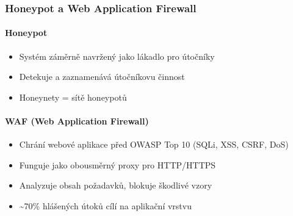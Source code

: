 \subsubsection{Honeypot a Web Application Firewall}

\paragraph{Honeypot}
\begin{itemize}
  \item Systém záměrně navržený jako lákadlo pro útočníky
  \item Detekuje a zaznamenává útočníkovu činnost
  \item Honeynety = sítě honeypotů
\end{itemize}

\paragraph{WAF (Web Application Firewall)}
\begin{itemize}
  \item Chrání webové aplikace před OWASP Top 10 (SQLi, XSS, CSRF, DoS)
  \item Funguje jako obousměrný proxy pro HTTP/HTTPS
  \item Analyzuje obsah požadavků, blokuje škodlivé vzory
  \item \textasciitilde 70\% hlášených útoků cílí na aplikační vrstvu
\end{itemize}


